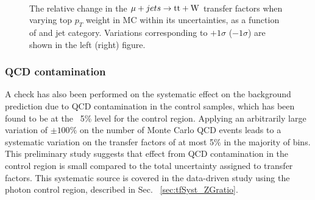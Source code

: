 \begin{figure}[!h]
  \centering
   ~~
  \\

  \caption{\label{fig:tfSyst_topPt_muToTtw} The relative change in the $\mu + jets \rightarrow \mathrm{tt+W}$ transfer
  factors when varying top $p_{T}$ weight in MC within its uncertainties, as a function of \scalht and jet category. 
  Variations corresponding to $+1\sigma$ ($-1\sigma$) are shown in the left (right) figure. 
  }
\end{figure}


\subsubsection*{QCD contamination}
\label{sec:tfSyst_qcdCont}

A check has also been performed on the systematic effect on the
background prediction due to QCD contamination in the control samples,
which has been found to be at the ~5\% level for the \gj
control region. Applying an arbitrarily large variation of $\pm
100\%$ on the number of Monte Carlo QCD events leads to a systematic
variation on the transfer factors of at most 5\% in the majority of bins.
This preliminary study suggests that effect from QCD
contamination in the \gj control region is small compared 
to the total uncertainty assigned to transfer factors. 
This systematic source is covered in the data-driven study  
using the photon control region, described in Sec. ~\ref{sec:tfSyst_ZGratio}.



